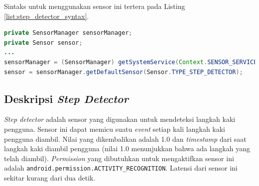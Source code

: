 Sintaks untuk menggunakan sensor ini tertera pada Listing \ref{list:step_detector_syntax}.

\begin{lstlisting}[caption={Sintaks menggunakan sensor \textit{step detector}},label={list:step_detector_syntax},language=java]
private SensorManager sensorManager;
private Sensor sensor;
...
sensorManager = (SensorManager) getSystemService(Context.SENSOR_SERVICE);
sensor = sensorManager.getDefaultSensor(Sensor.TYPE_STEP_DETECTOR);
\end{lstlisting} 

\subsection{Deskripsi \textit{Step Detector}}

\textit{Step detector} adalah sensor yang digunakan untuk mendeteksi langkah kaki pengguna. Sensor ini dapat memicu suatu \textit{event} setiap kali langkah kaki pengguna diambil. Nilai yang dikembalikan adalah 1.0 dan \textit{timestamp} dari saat langkah kaki diambil pengguna (nilai 1.0 menunjukkan bahwa ada langkah yang telah diambil). \textit{Permission} yang dibutuhkan untuk mengaktifkan sensor ini adalah \texttt{android.permission.ACTIVITY\_RECOGNITION}. Latensi dari sensor ini sekitar kurang dari dua detik. 